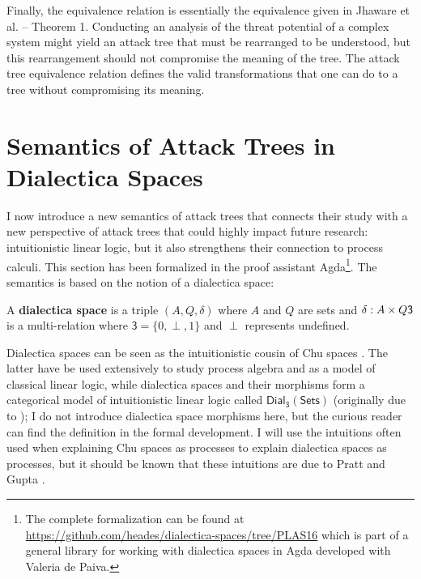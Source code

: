 \documentclass{llncs}
\let\to\relax
\newcommand{\to}{\rightarrow}
\newcommand{\dial}[0]{\mathsf{Dial_3}(\mathsf{Sets})}
\begin{document}
Finally, the equivalence relation is essentially the equivalence given
in Jhaware et al. \cite{Jhawar:2015} -- Theorem 1.  Conducting an
analysis of the threat potential of a complex system might yield an
attack tree that must be rearranged to be understood, but this
rearrangement should not compromise the meaning of the tree.  The
attack tree equivalence relation defines the valid transformations
that one can do to a tree without compromising its meaning.

\section{Semantics of Attack Trees in Dialectica Spaces}
\label{sec:concrete_semantics_of_attack_trees_in_dialectica_spaces}

I now introduce a new semantics of attack trees that connects their
study with a new perspective of attack trees that could highly impact
future research: intuitionistic linear logic, but it also strengthens
their connection to process calculi.  This section has been formalized
in the proof assistant Agda\footnote{The complete formalization can be
  found at
  \url{https://github.com/heades/dialectica-spaces/tree/PLAS16}
  which is part of a general library for working with dialectica
  spaces in Agda developed with Valeria de Paiva.}.  The semantics is
based on the notion of a dialectica space:

\begin{definition}
  \label{def:dialectica-space}
  A \textbf{dialectica space} is a triple $(A, Q, \delta)$ where $A$
  and $Q$ are sets and $\delta : A \times Q \to \mathsf{3}$ is a
  multi-relation where $\mathsf{3} = \{0,\perp,1\}$ and $\perp$
  represents undefined.
\end{definition}

Dialectica spaces can be seen as the intuitionistic cousin
\cite{dePaiva:2006b} of Chu spaces \cite{Pratt:1999}.  The latter have
be used extensively to study process algebra and as a model of
classical linear logic, while dialectica spaces and their morphisms
form a categorical model of intuitionistic linear logic called $\dial$
(originally due to \cite{dePaiva:1987}); I do not introduce
dialectica space morphisms here, but the curious reader can find the
definition in the formal development. I will use the intuitions often
used when explaining Chu spaces as processes to explain dialectica
spaces as processes, but it should be known that these intuitions are
due to Pratt and Gupta \cite{Gupta:1994}.
\end{document}
